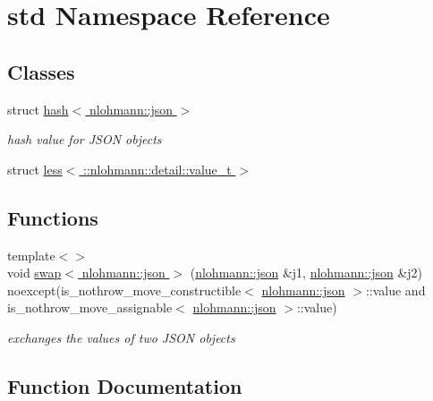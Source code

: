 \hypertarget{namespacestd}{}\section{std Namespace Reference}
\label{namespacestd}
\subsection*{Classes}
\begin{DoxyCompactItemize}
\item 
struct \hyperlink{structstd_1_1hash_3_01nlohmann_1_1json_01_4}{hash$<$ nlohmann\+::json $>$}
\begin{DoxyCompactList}\small\item\em hash value for J\+S\+ON objects \end{DoxyCompactList}\item 
struct \hyperlink{structstd_1_1less_3_01_1_1nlohmann_1_1detail_1_1value__t_01_4}{less$<$ \+::nlohmann\+::detail\+::value\+\_\+t $>$}
\end{DoxyCompactItemize}
\subsection*{Functions}
\begin{DoxyCompactItemize}
\item 
{\footnotesize template$<$$>$ }\\void \hyperlink{namespacestd_ace192546038d61d9c28ddfe0c3d732de}{swap$<$ nlohmann\+::json $>$} (\hyperlink{namespacenlohmann_a2bfd99e845a2e5cd90aeaf1b1431f474}{nlohmann\+::json} \&j1, \hyperlink{namespacenlohmann_a2bfd99e845a2e5cd90aeaf1b1431f474}{nlohmann\+::json} \&j2) noexcept(is\+\_\+nothrow\+\_\+move\+\_\+constructible$<$ \hyperlink{namespacenlohmann_a2bfd99e845a2e5cd90aeaf1b1431f474}{nlohmann\+::json} $>$\+::value and is\+\_\+nothrow\+\_\+move\+\_\+assignable$<$ \hyperlink{namespacenlohmann_a2bfd99e845a2e5cd90aeaf1b1431f474}{nlohmann\+::json} $>$\+::value)
\begin{DoxyCompactList}\small\item\em exchanges the values of two J\+S\+ON objects \end{DoxyCompactList}\end{DoxyCompactItemize}


\subsection{Function Documentation}
\mbox{\label{namespacestd_ace192546038d61d9c28ddfe0c3d732de}} 
